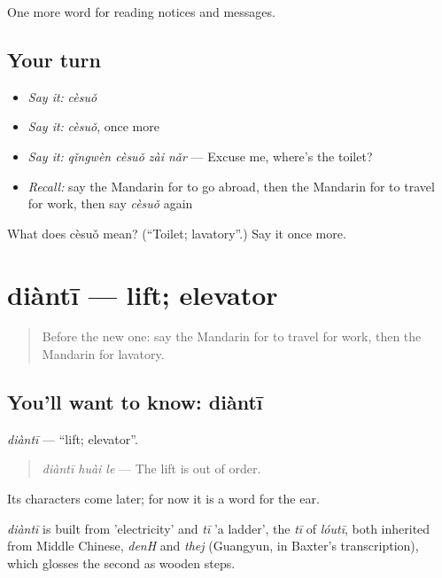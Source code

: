\begin{grammarlens}[title={What you've built}]
One more word for reading notices and messages.
\end{grammarlens}

\subsection*{Your turn}
\begin{itemize}
\raggedright
  \item \emph{Say it:} \emph{cèsuǒ}
  \item \emph{Say it:} \emph{cèsuǒ}, once more
  \item \emph{Say it:} \emph{qǐngwèn cèsuǒ zài nǎr} — Excuse me, where's the toilet?
  \item \emph{Recall:} say the Mandarin for to go abroad, then the Mandarin for to travel for work, then say \emph{cèsuǒ} again
\end{itemize}

\begin{tcolorbox}[breakable,colback=teal!4,colframe=teal!35!black,title={Before you move on}]
What does cèsuǒ mean? (\textquotedblleft{}Toilet; lavatory\textquotedblright{}.) Say it once more.
\end{tcolorbox}
\section[diàntī]{diàntī — lift; elevator}

\label{lesson:ZH-C192-dianti}



\begin{quote}
Before the new one: say the Mandarin for to travel for work, then the Mandarin for lavatory.
\end{quote}

\subsection*{You'll want to know: diàntī}
\emph{diàntī} — \textquotedblleft{}lift; elevator\textquotedblright{}.

\begin{quote}
\emph{diàntī huài le} — The lift is out of order.
\end{quote}

Its characters come later; for now it is a word for the ear.

\begin{cousinweb}
\emph{diàntī} is built from  'electricity' and \emph{tī} 'a ladder', the \emph{tī} of \emph{lóutī}, both inherited from Middle Chinese, \emph{denH} and \emph{thej} (Guangyun, in Baxter's transcription), which glosses the second as wooden steps.
\end{cousinweb}

